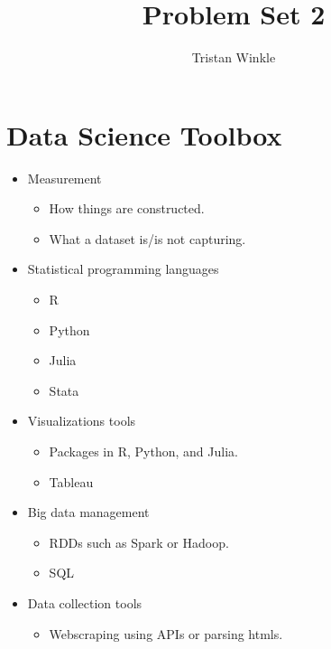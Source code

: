 \documentclass[12pt]{article}
\title{Problem Set 2}
\author{Tristan Winkle}
\date{}
\begin{document}
\maketitle

\section{Data Science Toolbox}

\begin{itemize}
    \item Measurement
        \begin{itemize}
            \item How things are constructed. 
            \item What a dataset is/is not capturing. 
        \end{itemize}

    \item Statistical programming languages
        \begin{itemize}
            \item R
            \item Python
            \item Julia
            \item Stata
        \end{itemize}

    \item Visualizations tools
        \begin{itemize}
            \item Packages in R, Python, and Julia.
            \item Tableau
        \end{itemize}

    \item Big data management
        \begin{itemize}
            \item RDDs such as Spark or Hadoop. 
            \item SQL
        \end{itemize}

    \item Data collection tools
        \begin{itemize}
            \item Webscraping using APIs or parsing htmls.
        \end{itemize}
\end{itemize}

\end{document}
